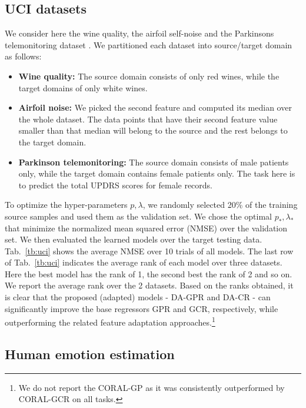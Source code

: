 \documentclass{article}
\begin{document}
\subsection{UCI datasets}

We consider here the wine quality, the airfoil self-noise and the Parkinsons telemonitoring dataset \cite{Lichman:2013}. We partitioned  each dataset into source/target domain as follows:

	
	\begin{itemize}
    
    \item \textbf{Wine quality:} The source domain consists of only red wines, while the target domains of only white wines.
    
        \item \textbf{Airfoil noise:} We picked the second feature and computed its median over the whole dataset. The data points that have their second feature value smaller than that median will belong to the source and the rest belongs to the target domain. 

\item 	\textbf{Parkinson telemonitoring: }	
The source domain consists of male patients only, while the target domain contains female patients only. The task here is to predict the total UPDRS scores for female records.

	\end{itemize}
 To optimize the hyper-parameters $p, \lambda$, we randomly selected 20\% of the training source samples and used them as the validation set. We chose the optimal $p_*, \lambda_*$ that minimize the normalized mean squared error (NMSE) over the validation set. We then evaluated the learned models over the target testing data.  Tab.~\ref{tb:uci} shows  the average NMSE over 10 trials of all models. The last row of Tab.~\ref{tb:uci} indicates the average rank of each model over three datasets. Here the best model has the rank of 1, the second best the rank of 2 and so on. We report the average rank over the 2 datasets. Based on the ranks obtained, it is clear that the proposed (adapted) models - DA-GPR and DA-CR - can significantly improve the base regressors GPR and GCR, respectively, while outperforming the related feature adaptation approaches.\footnote{We do not report the CORAL-GP as it was consistently outperformed by CORAL-GCR on all tasks.}
 
 
 
\subsection{Human emotion estimation}
    
\end{document}
